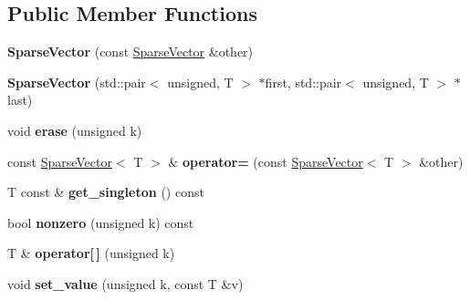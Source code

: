 \subsection*{Public Member Functions}
\begin{DoxyCompactItemize}
\item 
\mbox{\label{classcpyp_1_1_sparse_vector_a7fe9424c4508dee8a6bb7ef4aeb5cdff}} 
{\bfseries Sparse\+Vector} (const \mbox{\hyperlink{classcpyp_1_1_sparse_vector}{Sparse\+Vector}} \&other)
\item 
\mbox{\label{classcpyp_1_1_sparse_vector_a7a82b07b1af74ad0b8c9dc406794b3ac}} 
{\bfseries Sparse\+Vector} (std\+::pair$<$ unsigned, T $>$ $\ast$first, std\+::pair$<$ unsigned, T $>$ $\ast$last)
\item 
\mbox{\label{classcpyp_1_1_sparse_vector_a28b325943fc12feb4b36356c2fa9b473}} 
void {\bfseries erase} (unsigned k)
\item 
\mbox{\label{classcpyp_1_1_sparse_vector_aa1b26f2ae6f7d21b9e608a400ab937f2}} 
const \mbox{\hyperlink{classcpyp_1_1_sparse_vector}{Sparse\+Vector}}$<$ T $>$ \& {\bfseries operator=} (const \mbox{\hyperlink{classcpyp_1_1_sparse_vector}{Sparse\+Vector}}$<$ T $>$ \&other)
\item 
\mbox{\label{classcpyp_1_1_sparse_vector_a59c60662068e05f96d2e14203b5b809f}} 
T const  \& {\bfseries get\+\_\+singleton} () const
\item 
\mbox{\label{classcpyp_1_1_sparse_vector_a5e399e98e6f431bc95b315edea3de475}} 
bool {\bfseries nonzero} (unsigned k) const
\item 
\mbox{\label{classcpyp_1_1_sparse_vector_aadc7ed9b0ad723ceccae00fe5514df06}} 
T \& {\bfseries operator\mbox{[}$\,$\mbox{]}} (unsigned k)
\item 
\mbox{\label{classcpyp_1_1_sparse_vector_aaa2a8471f5fd47adb22ee5910fe7f9b8}} 
void {\bfseries set\+\_\+value} (unsigned k, const T \&v)
\item 
\mbox{\label{classcpyp_1_1_sparse_vector_a3d9440aedabf41acd21e20504fa310c5}} 

\end{DoxyCompactItemize}
